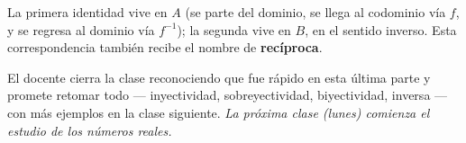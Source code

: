 \documentclass[12pt,a4paper]{article}
\begin{document}
La primera identidad vive en $A$ (se parte del dominio, se llega al codominio vía $f$, y se regresa al dominio vía $f^{-1}$); la segunda vive en $B$, en el sentido inverso. Esta correspondencia también recibe el nombre de \textbf{recíproca}.

\begin{notebox}
El docente cierra la clase reconociendo que fue rápido en esta última parte y promete retomar todo --- inyectividad, sobreyectividad, biyectividad, inversa --- con más ejemplos en la clase siguiente. \emph{La próxima clase (lunes) comienza el estudio de los números reales.}
\end{notebox}
\end{document}

